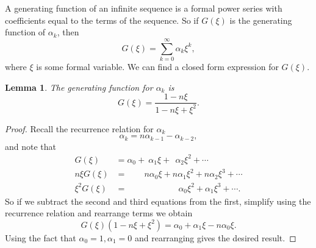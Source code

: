 \documentclass[12pt]{article}
\newtheorem{lemma}{Lemma}
\begin{document}
A generating function of an infinite sequence is a formal power series with coefficients equal to the terms of the sequence.  So if $G(\xi)$ is the generating function of $\alpha_k$, then 
\begin{equation*}
G(\xi) = \sum_{k=0}^{\infty} \alpha_k \xi^k,
\end{equation*}
where $\xi$ is some formal variable. We can find a closed form expression for $G(\xi)$.

\begin{lemma} The generating function for $\alpha_k$ is 
\begin{equation*}
G(\xi) = \frac{ 1 - n\xi}{1 - n \xi + \xi^2} .
\end{equation*}
\end{lemma}
\begin{proof}
Recall the recurrence relation for $\alpha_k$ 
\begin{equation*}
\alpha_k = n \alpha_{k-1} - \alpha_{k-2}, 
\end{equation*}
and note that 
\begin{align*}
G(\xi) &= \alpha_0 + \> \alpha_1 \xi + \>\> \alpha_2 \xi^2 + \cdots \\
n \xi G(\xi) &= \qquad n\alpha_0 \xi + n\alpha_1 \xi^2 + n\alpha_2 \xi^3 + \cdots \\
\xi^2 G(\xi) &= \qquad \qquad \quad \quad \alpha_0 \xi^2 + \alpha_1 \xi^3 +  \cdots.
\end{align*}
So if we subtract the second and third equations from the first, simplify using the recurrence relation and rearrange terms we obtain
\begin{equation*}
G( \xi) (1-n \xi + \xi^2) = \alpha_0 + \alpha_1 \xi - n\alpha_0 \xi.
\end{equation*}
Using the fact that $\alpha_0=1, \alpha_1=0$ and rearranging gives the desired result.
\end{proof}
\end{document}
